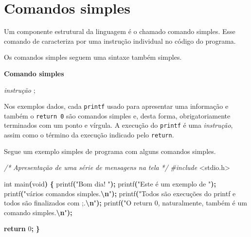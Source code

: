 \documentclass[
  11pt,
  a4paper,
]{scrbook}
\newenvironment{Shaded}{\begin{snugshade}}{\end{snugshade}}
\newcommand{\CommentTok}[1]{\textcolor[rgb]{0.56,0.35,0.01}{\textit{#1}}}
\newcommand{\ControlFlowTok}[1]{\textcolor[rgb]{0.13,0.29,0.53}{\textbf{#1}}}
\newcommand{\DataTypeTok}[1]{\textcolor[rgb]{0.13,0.29,0.53}{#1}}
\newcommand{\DecValTok}[1]{\textcolor[rgb]{0.00,0.00,0.81}{#1}}
\newcommand{\ImportTok}[1]{#1}
\newcommand{\NormalTok}[1]{#1}
\newcommand{\OperatorTok}[1]{\textcolor[rgb]{0.81,0.36,0.00}{\textbf{#1}}}
\newcommand{\PreprocessorTok}[1]{\textcolor[rgb]{0.56,0.35,0.01}{\textit{#1}}}
\newcommand{\SpecialCharTok}[1]{\textcolor[rgb]{0.81,0.36,0.00}{\textbf{#1}}}
\newcommand{\StringTok}[1]{\textcolor[rgb]{0.31,0.60,0.02}{#1}}
\begin{document}
\section{Comandos simples}\label{comandos-simples}

 Um componente estrutural da linguagem é o
chamado comando simples. Esse comando de caracteriza por uma instrução
individual no código do programa.

Os comandos simples seguem uma sintaxe também simples.

\begin{tcolorbox}[enhanced jigsaw, colback=white, arc=.35mm, colframe=quarto-callout-color-frame, toprule=.15mm, leftrule=.75mm, left=2mm, rightrule=.15mm, bottomrule=.15mm, opacityback=0, breakable]

\vspace{-3mm}\textbf{Comando simples}\vspace{3mm}

\emph{instrução} ;

\end{tcolorbox}

Nos exemplos dados, cada \texttt{printf} usado para apresentar uma
informação e também o \texttt{return\ 0} são comandos simples e, desta
forma, obrigatoriamente terminados com um ponto e vírgula. A execução do
\texttt{printf} é uma \emph{instrução}, assim como o término da execução
indicado pelo \texttt{return}.

Segue um exemplo simples de programa com alguns comandos simples.

\begin{Shaded}
\begin{Highlighting}[]
\CommentTok{/*}
\CommentTok{Apresentação de uma série de mensagens na tela}
\CommentTok{*/}
\PreprocessorTok{\#include }\ImportTok{\textless{}stdio.h\textgreater{}}

\DataTypeTok{int}\NormalTok{ main}\OperatorTok{(}\DataTypeTok{void}\OperatorTok{)} \OperatorTok{\{}
\NormalTok{    printf}\OperatorTok{(}\StringTok{"Bom dia! "}\OperatorTok{);}
\NormalTok{    printf}\OperatorTok{(}\StringTok{"Este é um exemplo de "}\OperatorTok{);}
\NormalTok{    printf}\OperatorTok{(}\StringTok{"vários comandos simples.}\SpecialCharTok{\textbackslash{}n}\StringTok{"}\OperatorTok{);}
\NormalTok{    printf}\OperatorTok{(}\StringTok{"Todos são execuções do printf e todos são finalizados com \textquotesingle{};\textquotesingle{}.}\SpecialCharTok{\textbackslash{}n}\StringTok{"}\OperatorTok{);}
\NormalTok{    printf}\OperatorTok{(}\StringTok{"O \textquotesingle{}return 0\textquotesingle{}, naturalmente, também é um comando simples.}\SpecialCharTok{\textbackslash{}n}\StringTok{"}\OperatorTok{);}

    \ControlFlowTok{return} \DecValTok{0}\OperatorTok{;}
\OperatorTok{\}}
\end{Highlighting}
\end{Shaded}
\end{document}
